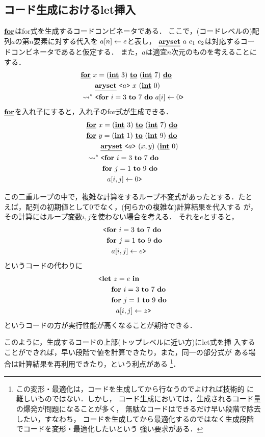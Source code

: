 \subsection{コード生成におけるlet挿入}

$\underline{\textbf{for}}$はfor式を生成するコードコンビネータである．
ここで，(コードレベルの)配列$a$の第$n$要素に対する代入を
${a}[{n}]\leftarrow {e}$と表し，
$\underline{\textbf{aryset}}~{a}~{e_1}~{e_2}$は対応するコードコンビネータであると仮定する．
また，$a$は適宜$n$次元のものを考えることにする．
\begin{align*}
  & \underline{\textbf{for}}~{x=(\underline{\textbf{int}}~3)}~\underline{\textbf{to}}~{(\underline{\textbf{int}}~7)}~\underline{\textbf{do}} \\
  & \qquad \underline{\textbf{aryset}}~{\texttt{<}{a}\texttt{>}}~{x}~{(\underline{\textbf{int}}~0)} \\
  & \leadsto^* \texttt{<}{\textbf{for}~{i=3}~\textbf{to}~{7}~\textbf{do}~{a}[{i}]\leftarrow {0}}\texttt{>}
\end{align*}
$\underline{\textbf{for}}$を入れ子にすると，入れ子のfor式が生成できる．
\begin{align*}
  & \cforin{x=(\cint~3)}{(\cint~7)} \\
  & \cforin{y=(\cint~1)}{(\cint~9)} \\
  & \qquad \caryset{\code{a}}{(x,y)}{(\cint~0)} \\
  & \too \codebegin \forin{i=3}{7} \\
  & \phantom{\too \codebegin} \forin{j=1}{9} \\
  & \phantom{\too \codebegin} ~~\aryset{a}{i,j}{0} \codeend
\end{align*}

この二重ループの中で，複雑な計算をするループ不変式があったとする．たと
えば，配列の初期値として$0$でなく，(何らかの複雑な)計算結果を代入する
が，その計算にはループ変数$i,j$を使わない場合を考える．
それを$e$とすると，
\begin{align*}
  & \codebegin \forin{i=3}{7} \\
  & \phantom{\codebegin} \forin{j=1}{9} \\
  & \phantom{\codebegin} ~~\aryset{a}{i,j}{e} \codeend
\end{align*}
というコードの代わりに
\begin{align*}
  & \codebegin \Let~z=e~\In \\
  & \phantom{\codebegin \Let} \forin{i=3}{7} \\
  & \phantom{\codebegin \Let} \forin{j=1}{9} \\
  & \phantom{\codebegin \Let} ~~\aryset{a}{i,j}{z} \codeend
\end{align*}
というコードの方が実行性能が高くなることが期待できる．

このように，生成するコードの上部(トップレベルに近い方)にlet式を挿
入することができれば，早い段階で値を計算できたり，また，同一の部分式が
ある場合は計算結果を再利用できたり，という利点がある%
\footnote{この変形・最適化は，コードを生成してから行なうのでよければ技術的
  に難しいものではない．しかし，
  コード生成においては，生成されるコード量の爆発が問題になることが多く，
  無駄なコードはできるだけ早い段階で除去したい，すなわち，
  コードを生成してから最適化するのではなく生成段階でコードを変形・最適化したいという
  強い要求がある．}．

